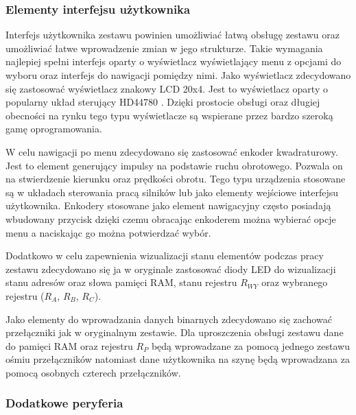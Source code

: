 \documentclass[../main.tex]{subfiles}
\begin{document}
    \subsubsection{Elementy interfejsu użytkownika}

    Interfejs użytkownika zestawu powinien umożliwiać łatwą obsługę zestawu oraz umożliwiać łatwe wprowadzenie zmian w jego strukturze. Takie wymagania
    najlepiej spełni interfejs oparty o wyświetlacz wyświetlający menu z opcjami do wyboru oraz interfejs do nawigacji pomiędzy nimi. 
    Jako wyświetlacz zdecydowano się zastosować wyświetlacz znakowy LCD 20x4. Jest to wyświetlacz oparty o popularny układ sterujący HD44780 \cite{lcd_hd44780}.
    Dzięki prostocie obsługi oraz długiej obecności na rynku tego typu wyświetlacze są wspierane przez bardzo szeroką gamę oprogramowania.
    \par
    W celu nawigacji po menu zdecydowano się zastosować enkoder kwadraturowy. Jest to element generujący impulsy na podstawie ruchu obrotowego.
    Pozwala on na stwierdzenie kierunku oraz prędkości obrotu. Tego typu urządzenia stosowane są w układach sterowania pracą silników lub jako elementy
    wejściowe interfejsu użytkownika. Enkodery stosowane jako element nawigacyjny często posiadają wbudowany przycisk \cite{encoder} dzięki czemu obracając
    enkoderem można wybierać opcje menu a naciskając go można potwierdzać wybór.
    \par
    Dodatkowo w celu zapewnienia wizualizacji stanu elementów podczas pracy zestawu zdecydowano się ja w oryginale zastosować diody LED do 
    wizualizacji stanu adresów oraz słowa pamięci RAM, stanu rejestru $R_{WY}$ oraz wybranego rejestru ($R_A$, $R_B$, $R_C$).
    \par
    Jako elementy do wprowadzania danych binarnych zdecydowano się zachować przełączniki jak w oryginalnym zestawie. Dla uproszczenia obsługi zestawu
    dane do pamięci RAM oraz rejestru $R_P$ będą wprowadzane za pomocą jednego zestawu ośmiu przełączników natomiast dane użytkownika
    na szynę będą wprowadzana za pomocą osobnych czterech przełączników.

    \subsubsection{Dodatkowe peryferia}
\end{document}
